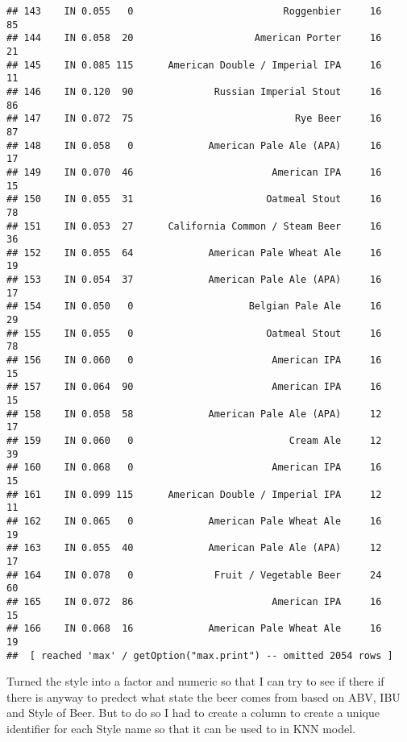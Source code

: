 \documentclass[
]{article}
\begin{document}
\begin{verbatim}
## 143    IN 0.055   0                          Roggenbier     16      85
## 144    IN 0.058  20                     American Porter     16      21
## 145    IN 0.085 115      American Double / Imperial IPA     16      11
## 146    IN 0.120  90              Russian Imperial Stout     16      86
## 147    IN 0.072  75                            Rye Beer     16      87
## 148    IN 0.058   0             American Pale Ale (APA)     16      17
## 149    IN 0.070  46                        American IPA     16      15
## 150    IN 0.055  31                       Oatmeal Stout     16      78
## 151    IN 0.053  27      California Common / Steam Beer     16      36
## 152    IN 0.055  64             American Pale Wheat Ale     16      19
## 153    IN 0.054  37             American Pale Ale (APA)     16      17
## 154    IN 0.050   0                    Belgian Pale Ale     16      29
## 155    IN 0.055   0                       Oatmeal Stout     16      78
## 156    IN 0.060   0                        American IPA     16      15
## 157    IN 0.064  90                        American IPA     16      15
## 158    IN 0.058  58             American Pale Ale (APA)     12      17
## 159    IN 0.060   0                           Cream Ale     12      39
## 160    IN 0.068   0                        American IPA     16      15
## 161    IN 0.099 115      American Double / Imperial IPA     12      11
## 162    IN 0.065   0             American Pale Wheat Ale     16      19
## 163    IN 0.055  40             American Pale Ale (APA)     12      17
## 164    IN 0.078   0              Fruit / Vegetable Beer     24      60
## 165    IN 0.072  86                        American IPA     16      15
## 166    IN 0.068  16             American Pale Wheat Ale     16      19
##  [ reached 'max' / getOption("max.print") -- omitted 2054 rows ]
\end{verbatim}

Turned the style into a factor and numeric so that I can try to see if
there if there is anyway to predect what state the beer comes from based
on ABV, IBU and Style of Beer. But to do so I had to create a column to
create a unique identifier for each Style name so that it can be used to
in KNN model.
\end{document}
